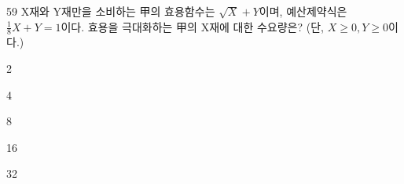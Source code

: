 \begin{question}{59}
X재와 Y재만을 소비하는 甲의 효용함수는 $\sqrt{X}+Y$이며, 예산제약식은 $\frac{ 1 } { 8 } X +Y = 1$이다. 효용을 극대화하는 甲의 X재에 대한 수요량은? (단, $X \geq 0, Y \geq 0$이다.)
\begin{choices}
  \item 2
  \item 4
  \item 8
  \item 16
  \item 32
\end{choices}
\end{question}
